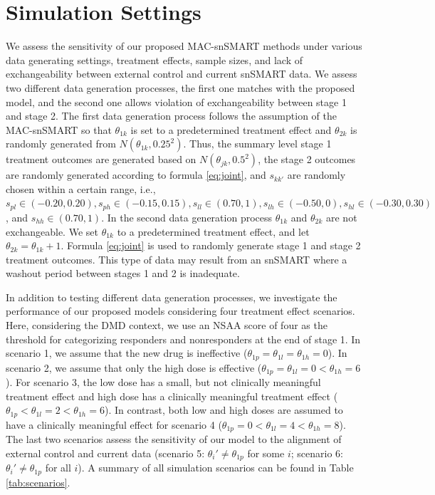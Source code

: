 \section{Simulation Settings} \label{s:simulation}

We assess the sensitivity of our proposed MAC-snSMART methods under various data generating settings, treatment effects, sample sizes, and lack of exchangeability between external control and current \ac{snSMART} data. We assess two different data generation processes, the first one matches with the proposed model, and the second one allows violation of exchangeability between stage 1 and stage 2. The first data generation process follows the assumption of the MAC-snSMART so that $\theta_{1k}$ is set to a predetermined treatment effect and $\theta_{2k}$ is randomly generated from $N(\theta_{1k}, 0.25^2)$. Thus, the summary level stage 1 treatment outcomes are generated based on $N(\theta_{jk}, 0.5^2)$, the stage 2 outcomes are randomly generated according to formula \ref{eq:joint}, and $s_{kk'}$ are randomly chosen within a certain range, i.e., $s_{pl} \in (-0.20, 0.20), s_{ph} \in (-0.15, 0.15), s_{ll} \in (0.70, 1), s_{lh} \in (-0.50, 0), s_{hl} \in (-0.30, 0.30)$, and $s_{hh} \in (0.70, 1)$. In the second data generation process $\theta_{1k}$ and $\theta_{2k}$ are not exchangeable. We set $\theta_{1k}$ to a predetermined treatment effect, and let $\theta_{2k} = \theta_{1k} + 1$. Formula \ref{eq:joint} is used to randomly generate stage 1 and stage 2 treatment outcomes. This type of data may result from an \ac{snSMART} where a washout period between stages 1 and 2 is inadequate. 

In addition to testing different data generation processes, we investigate the performance of our proposed models considering four treatment effect scenarios. Here, considering the \ac{DMD} context, we use an \ac{NSAA} score of four as the threshold for categorizing responders and nonresponders at the end of stage 1. In scenario 1, we assume that the new drug is ineffective ($\theta_{1p} = \theta_{1l} = \theta_{1h} = 0$). In scenario 2, we assume that only the high dose is effective ($\theta_{1p} = \theta_{1l} = 0 < \theta_{1h} = 6$). For scenario 3, the low dose has a small, but not clinically meaningful treatment effect and high dose has a clinically meaningful treatment effect ($\theta_{1p} < \theta_{1l} = 2 < \theta_{1h} = 6$). In contrast, both low and high doses are assumed to have a clinically meaningful effect for scenario 4 ($\theta_{1p} = 0 < \theta_{1l} = 4 < \theta_{1h} = 8$). The last two scenarios assess the sensitivity of our model to the alignment of external control and current data (scenario 5: $\theta_i' \ne \theta_{1p}$ for some $i$; scenario 6: $\theta_i' \ne \theta_{1p}$ for all $i$). A summary of all simulation scenarios can be found in Table \ref{tab:scenarios}.

